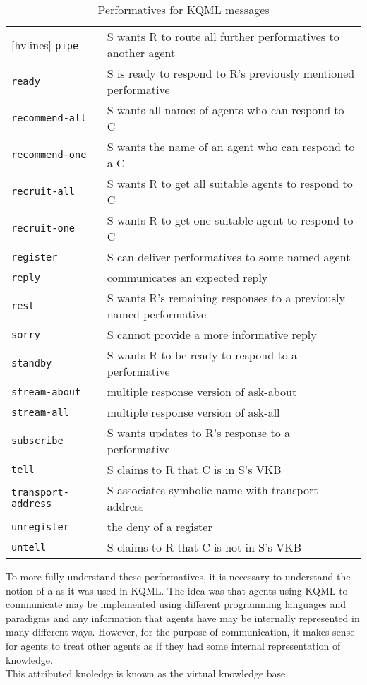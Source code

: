 \begin{table}[!h]
\begin{NiceTabular}{ll}[hvlines]
\texttt{pipe}&S wants R to route all further performatives to another agent\\
\texttt{ready}&S is ready to respond to R’s previously mentioned performative\\
\texttt{recommend-all}&S wants all names of agents who can respond to C\\
\texttt{recommend-one}&S wants the name of an agent who can respond to a C\\
\texttt{recruit-all}&S wants R to get all suitable agents to respond to C\\
\texttt{recruit-one}&S wants R to get one suitable agent to respond to C\\
\texttt{register}&S can deliver performatives to some named agent\\
\texttt{reply}&communicates an expected reply\\
\texttt{rest}&S wants R’s remaining responses to a previously named performative\\
\texttt{sorry}&S cannot provide a more informative reply\\
\texttt{standby}&S wants R to be ready to respond to a performative\\
\texttt{stream-about}&multiple response version of ask-about\\
\texttt{stream-all}&multiple response version of ask-all\\
\texttt{subscribe}&S wants updates to R’s response to a performative\\
\texttt{tell}&S claims to R that C is in S’s VKB\\
\texttt{transport-address}&S associates symbolic name with transport address\\
\texttt{unregister}&the deny of a register\\
\texttt{untell}&S claims to R that C is not in S’s VKB
\end{NiceTabular}
\caption{Performatives for KQML messages}
\label{tbl:KQMLper}
\end{table}

To more fully understand these performatives, it is necessary to understand the notion of a  as it was used in KQML. The idea was that agents using KQML to communicate may be implemented using different programming languages and paradigms and any information that agents have may be internally represented in many different ways. However, for the purpose of communication, it makes sense for agents to treat other agents as if they had some internal representation of knowledge.  \\
This attributed knoledge is known as the virtual knowledge base.\\


